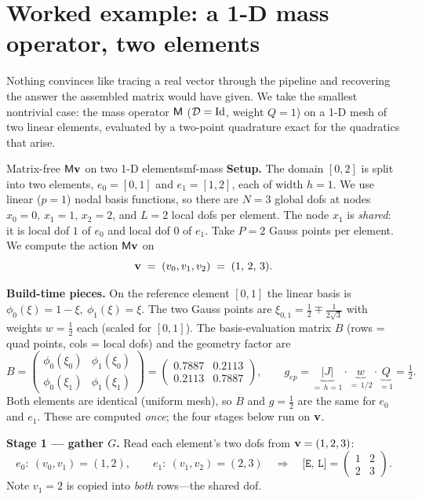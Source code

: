 \section{Worked example: a 1-D mass operator, two elements}
\label{sec:mf-wex1}

Nothing convinces like tracing a real vector through the pipeline and recovering
the answer the assembled matrix would have given. We take the smallest nontrivial
case: the mass operator $\mathsf{M}$ ($\mathcal{D}=\mathrm{Id}$, weight $Q=1$) on a 1-D
mesh of two linear elements, evaluated by a two-point quadrature exact for the
quadratics that arise.

\begin{workedexample}{Matrix-free $\mathsf{M}\mathbf{v}$ on two 1-D elements}{mf-mass}
\textbf{Setup.} The domain $[0,2]$ is split into two elements,
$e_0=[0,1]$ and $e_1=[1,2]$, each of width $h=1$. We use linear ($p=1$)
nodal basis functions, so there are $N=3$ global dofs at nodes
$x_0=0,\,x_1=1,\,x_2=2$, and $L=2$ local dofs per element. The node $x_1$ is
\emph{shared}: it is local dof $1$ of $e_0$ and local dof $0$ of $e_1$. Take
$P=2$ Gauss points per element. We compute the action $\mathsf{M}\mathbf{v}$ on
\[
  \mathbf{v} \;=\; (v_0,v_1,v_2) \;=\; (1,\,2,\,3) .
\]

\textbf{Build-time pieces.} On the reference element $[0,1]$ the linear basis is
$\phi_0(\xi)=1-\xi,\ \phi_1(\xi)=\xi$. The two Gauss points are
$\xi_{0,1}=\tfrac12\mp\tfrac{1}{2\sqrt3}$ with weights $w=\tfrac12$ each (scaled
for $[0,1]$). The basis-evaluation matrix $B$ (rows = quad points, cols = local
dofs) and the geometry factor are
\[
  B=\begin{pmatrix}\phi_0(\xi_0)&\phi_1(\xi_0)\\[2pt]\phi_0(\xi_1)&\phi_1(\xi_1)\end{pmatrix}
   =\begin{pmatrix}0.7887&0.2113\\[2pt]0.2113&0.7887\end{pmatrix},
  \qquad
  g_{ep}=\underbrace{|J|}_{=\,h=1}\cdot \underbrace{w}_{=\,1/2}\cdot \underbrace{Q}_{=1}
        =\tfrac12 .
\]
Both elements are identical (uniform mesh), so $B$ and $g=\tfrac12$ are the same
for $e_0$ and $e_1$. These are computed \emph{once}; the four stages below run on
$\mathbf{v}$.

\tcblower
\textbf{Stage 1 --- gather $G$.} Read each element's two dofs from $\mathbf{v}=(1,2,3)$:
\[
  e_0:\ (v_0,v_1)=(1,2),\qquad e_1:\ (v_1,v_2)=(2,3)
  \quad\Rightarrow\quad
  \texttt{[E, L]}=\begin{pmatrix}1&2\\2&3\end{pmatrix}.
\]
Note $v_1=2$ is copied into \emph{both} rows---the shared dof.


\end{workedexample}

